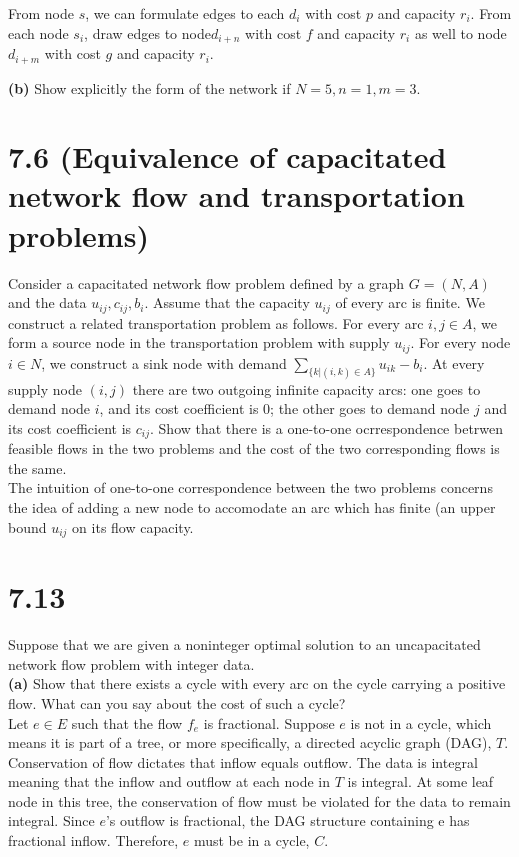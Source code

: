 \documentclass{article}
\begin{document}
From node $s$, we can formulate edges to each $d_i$ with cost $p$ and capacity $r_i$.  From  each node $s_i$, draw edges to node$d_{i+n}$ with cost $f$ and capacity $r_i$ as well to node $d_{i+m}$ with  cost $g$ and capacity $r_i$.

\noindent \textbf{(b)}
Show explicitly the form of the network if $N = 5, n=1, m=3$.   \\


\section*{7.6 (Equivalence of capacitated network flow and transportation problems)}
Consider a capacitated network flow problem defined by a graph $G = (N,A)$ and the data $u_{ij}, c_{ij}, b_i$.  Assume that the capacity $u_{ij}$ of every arc is finite.  We construct a related transportation problem as follows.  For every arc $i,j \in A$, we form a source node in the transportation problem with supply $u_{ij}$.  For every node $i \in N$, we construct a sink node with demand $\sum_{\{k | (i,k) \in A \}} u_{ik} - b_i$.  At every supply node $(i,j)$ there are two outgoing infinite capacity arcs:  one goes to demand node $i$, and its cost coefficient is 0; the other goes to demand node $j$ and its cost coefficient is $c_{ij}$.  Show that there is a one-to-one ocrrespondence betrwen feasible flows in the two problems and the cost of the two corresponding flows is the same. \\

The intuition of one-to-one correspondence between the two problems concerns the idea of adding a new node to accomodate an arc which has finite (an upper bound $u_{ij}$ on its flow capacity.


\section*{7.13}
Suppose that we are given a noninteger optimal solution to an uncapacitated network flow problem with integer data. \\

\noindent \textbf{(a)}  Show that there exists a cycle with every arc on the cycle carrying a positive flow.  What can you say about the cost of such a cycle? \\

\noindent
Let $e \in E$ such that the flow $f_{e}$ is fractional.  Suppose $e$ is not in a cycle, which means it is part of a tree, or more specifically, a directed acyclic graph (DAG), $T$.  Conservation of flow dictates that inflow equals outflow.  The data is integral meaning that the inflow and outflow at each node in $T$ is integral.  At some leaf node in this tree, the conservation of flow must be violated for the data to remain integral.  Since $e$'s outflow is fractional, the DAG structure containing e has fractional inflow.  Therefore, $e$ must be in a cycle, $C$. \\
\end{document}
